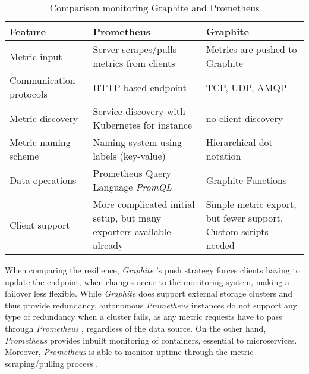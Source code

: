 \begin{table}[h!]
	\begin{tabularx}{\linewidth}{ | l | X | X | }
		\hline
		Feature                 & Prometheus                                                           & Graphite                                                       \\
		\hline
		Metric input            & Server scrapes/pulls metrics from clients                            & Metrics are pushed to Graphite                                 \\
		Communication protocols & HTTP-based endpoint                                                  & TCP, UDP, AMQP                                                 \\
		Metric discovery        & Service discovery with Kubernetes for instance                       & no client discovery                                            \\
		Metric naming scheme    & Naming system using labels (key-value)                               & Hierarchical dot notation                                      \\
		Data operations         & Prometheus Query Language \textit{PromQL}                            & Graphite Functions                                             \\
		Client support          & More complicated initial setup, but many exporters available already & Simple metric export, but fewer support. Custom scripts needed \\
		\hline
	\end{tabularx}
	\caption{Comparison monitoring Graphite and Prometheus \cite{Erez.2019}\cite{Frazier.2019}\cite{Berman.2018}}
	\label{tab:comparisonmonitoring}
\end{table}

When comparing the resilience, \textit{Graphite} 's push strategy forces clients having to update the endpoint, when changes occur to the monitoring system, making a failover less flexible.
While \textit{Graphite}  does support external storage clusters and thus provide redundancy, autonomous \textit{Prometheus}  instances do not support any type of redundancy when a cluster fails, as any metric requests have to pass through \textit{Prometheus} , regardless of the data source.
On the other hand, \textit{Prometheus}  provides inbuilt monitoring of containers, essential to microservices.
Moreover, \textit{Prometheus}  is able to monitor uptime through the metric scraping/pulling process \cite{Berman.2018}\cite{Erez.2019}.

